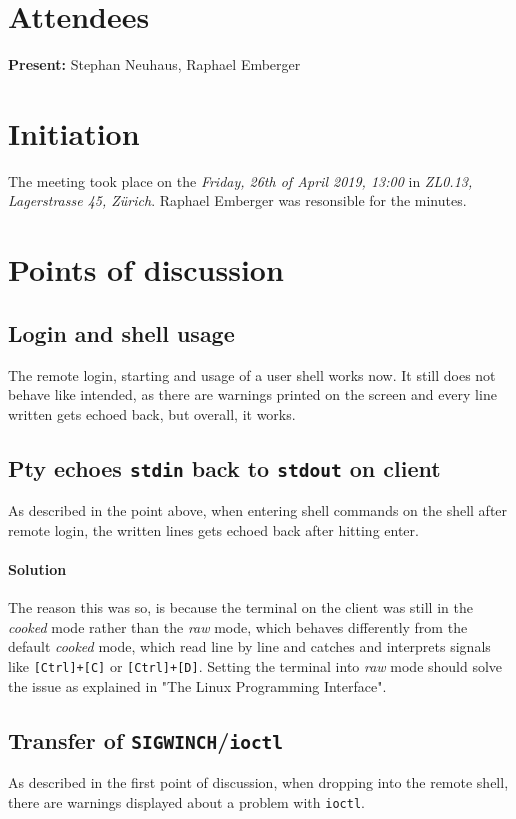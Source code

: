 \documentclass[10pt,a4paper,twoside,english,minutes]{zhawreprt}
\begin{document}
\maketitle

\section{Attendees}\label{sec:Attandees}
\textbf{Present:} Stephan Neuhaus, Raphael Emberger

\section{Initiation}\label{sec:Initiation}
The meeting took place on the \textit{Friday, 26th of April 2019, 13:00} in \textit{ZL0.13, Lagerstrasse 45, Zürich}. Raphael Emberger was resonsible for the minutes.

\section{Points of discussion}
\subsection{Login and shell usage}
The remote login, starting and usage of a user shell works now. It still does not behave like intended, as there are warnings printed on the screen and every line written gets echoed back, but overall, it works.

\subsection{Pty echoes \texttt{stdin} back to \texttt{stdout} on client}
As described in the point above, when entering shell commands on the shell after remote login, the written lines gets echoed back after hitting enter.
\paragraph{Solution}
The reason this was so, is because the terminal on the client was still in the \textit{cooked} mode rather than the \textit{raw} mode, which behaves differently from the default \textit{cooked} mode, which read line by line and catches and interprets signals like \texttt{[Ctrl]+[C]} or \texttt{[Ctrl]+[D]}. Setting the terminal into \textit{raw} mode should solve the issue as explained in "The Linux Programming Interface".

\subsection{Transfer of \texttt{SIGWINCH}/\texttt{ioctl}}
As described in the first point of discussion, when dropping into the remote shell, there are warnings displayed about a problem with \texttt{ioctl}.
\end{document}
